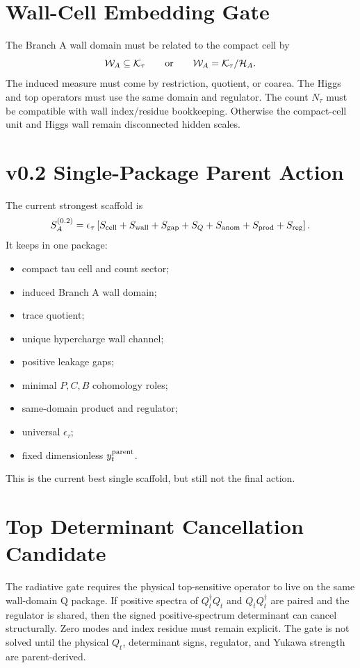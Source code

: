 \documentclass[11pt]{article}
\begin{document}
\section{Wall-Cell Embedding Gate}
The Branch A wall domain must be related to the compact cell by
\begin{equation}
{\cal W}_A\subseteq{\cal K}_\tau
\qquad
\hbox{or}
\qquad
{\cal W}_A={\cal K}_\tau/{\cal H}_A.
\end{equation}
The induced measure must come by restriction, quotient, or coarea.  The Higgs
and top operators must use the same domain and regulator.  The count $N_\tau$
must be compatible with wall index/residue bookkeeping.  Otherwise the
compact-cell unit and Higgs wall remain disconnected hidden scales.

\section{v0.2 Single-Package Parent Action}
The current strongest scaffold is
\begin{equation}
S_A^{(0.2)}=
\epsilon_\tau
\left[
S_{\rm cell}+S_{\rm wall}+S_{\rm gap}+S_Q+S_{\rm anom}
+S_{\rm prod}+S_{\rm reg}
\right].
\end{equation}
It keeps in one package:
\begin{itemize}
\item compact tau cell and count sector;
\item induced Branch A wall domain;
\item trace quotient;
\item unique hypercharge wall channel;
\item positive leakage gaps;
\item minimal $P,C,B$ cohomology roles;
\item same-domain product and regulator;
\item universal $\epsilon_\tau$;
\item fixed dimensionless $y_t^{\rm parent}$.
\end{itemize}
This is the current best single scaffold, but still not the final action.

\section{Top Determinant Cancellation Candidate}
The radiative gate requires the physical top-sensitive operator to live on the
same wall-domain Q package.  If positive spectra of $Q_t^\dagger Q_t$ and
$Q_tQ_t^\dagger$ are paired and the regulator is shared, then the signed
positive-spectrum determinant can cancel structurally.  Zero modes and index
residue must remain explicit.  The gate is not solved until the physical
$Q_t$, determinant signs, regulator, and Yukawa strength are parent-derived.
\end{document}
